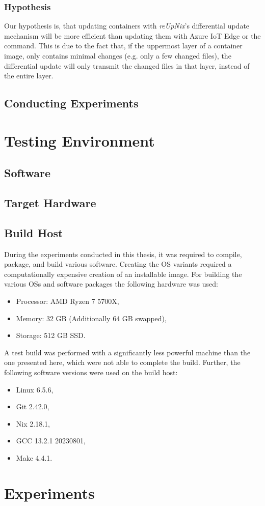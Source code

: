 \subsubsection{Hypothesis}
Our hypothesis is, that updating containers with \textit{reUpNix}'s differential
update mechanism will be more efficient than updating them with Azure IoT Edge or
the  command. This is due to the fact that, if the uppermost
layer of a container image, only contains minimal changes (e.g. only a few
changed files), the differential update will only transmit the changed files in
that layer, instead of the entire layer.

\subsection{Conducting Experiments}
\section{Testing Environment}
\subsection{Software}
\subsection{Target Hardware}
\subsection{Build Host}
During the experiments conducted in this thesis, it was required to compile,
package, and build various software. Creating the \ac{OS} variants required a
computationally expensive
creation of an installable image. For building the
various \ac{OS}s and software packages the following hardware was used:

\begin{itemize}
    \item Processor: AMD Ryzen 7 5700X,
    \item Memory: 32 GB (Additionally 64 GB swapped),
    \item Storage: 512 GB SSD.
\end{itemize}

\noindent
A test build was performed with a significantly less powerful machine than the
one presented here, which were not able to complete the build.
Further, the following software versions were used on the build host:
\begin{itemize}
    \item Linux 6.5.6,
    \item Git 2.42.0,
    \item Nix 2.18.1,
    \item GCC 13.2.1 20230801,
    \item Make 4.4.1.
\end{itemize}

\section{Experiments}
